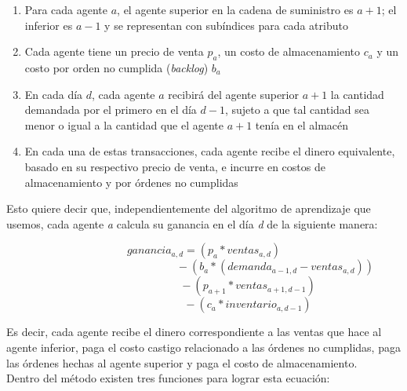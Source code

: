 \begin{enumerate}
    \item Para cada agente \textit{$a$}, el agente superior en la cadena de suministro es \textit{$a+1$}; el inferior es \textit{$a-1$} y se representan con sub\'indices para cada atributo
    \item Cada agente tiene un precio de venta \textit{$p_{a}$}, un costo de almacenamiento \textit{$c_{a}$} y un costo por orden no cumplida (\textit{backlog}) \textit{$b_{a}$}
    \item En cada d\'ia \textit{$d$}, cada agente \textit{$a$} recibir\'a del agente superior \textit{$a+1$} la cantidad demandada por el primero en el d\'ia \textit{$d-1$}, sujeto a que tal cantidad sea menor o igual a la cantidad que el agente \textit{$a+1$} ten\'ia en el almac\'en
    \item En cada una de estas transacciones, cada agente recibe el dinero equivalente, basado en su respectivo precio de venta, e incurre en costos de almacenamiento y por \'ordenes no cumplidas
\end{enumerate}


Esto quiere decir que, independientemente del algoritmo de aprendizaje que usemos, cada agente \textit{a} calcula su ganancia en el d\'ia \textit{d} de la siguiente manera:

$$
ganancia_{a,d} = (p_{a} * ventas_{a, d}) 
$$
$$
\quad  \quad  \quad  \quad  \quad  \quad  \quad  \quad  \quad \quad  \quad   \quad  \quad - (b_{a}* (demanda_{a-1,d} - ventas_{a,d})) 
$$
$$
\quad  \quad  \quad  \quad  \quad  \quad  \quad  \quad - (p_{a+1}*ventas_{a+1, d-1})
$$
$$
\quad  \quad  \quad  \quad  \quad  \quad  \quad  \quad - (c_{a}*inventario_{a,d-1})
$$

Es decir, cada agente recibe el dinero correspondiente a las ventas que hace al agente inferior, paga el costo castigo relacionado a las \'ordenes no cumplidas, paga las \'ordenes hechas al agente superior y paga el costo de almacenamiento.\\

Dentro del m\'etodo existen tres funciones para lograr esta ecuaci\'on:

